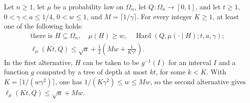 \begin{theorem}\label{ian:hard-sector-regularity}
Let \(n\ge1\), let \(\mu\) be a probability law on \(\Omega_n\), let \(Q:\Omega_n\to[0,1]\), and let \(t\ge1\),
\(0<\gamma<a\le1/4\), \(0<w\le1\), and \(M=\lceil1/\gamma\rceil\). For every integer \(K\ge1\), at least one of
the following holds:
\[
 \begin{gathered}
 \text{there is }H\subseteq\Omega_n,\quad \mu(H)\ge w,\quad \operatorname{Hard}(Q,\mu(\cdot\mid H);t,a,\gamma);
 \\[2mm] \ell_\mu(Kt,Q)\le\sqrt a+\frac12\left(Mw+\frac1{K\gamma^2}\right).
 \end{gathered}
\]
In the first alternative, \(H\) can be taken to be \(g^{-1}(I)\) for an interval \(I\) and a function \(g\)
computed by a tree of depth at most \(kt\), for some \(k<K\). With \(K=\lceil1/(w\gamma^2)\rceil\), one has
\(1/(K\gamma^2)\le w\le Mw\), so the second alternative gives \(\ell_\mu(Kt,Q)\le\sqrt a+Mw\).
\end{theorem}
